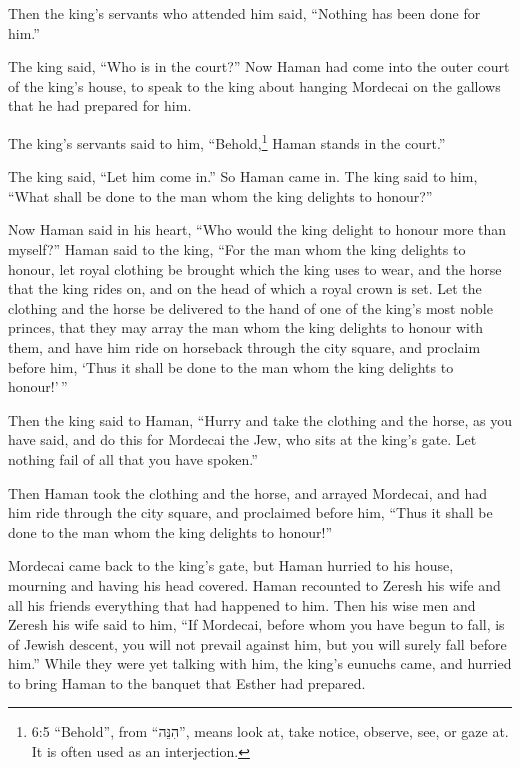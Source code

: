 Then the king's servants who attended him said, ``Nothing has been done
for him.''

 The king said, ``Who is in the court?'' Now Haman had come
into the outer court of the king's house, to speak to the king about
hanging Mordecai on the gallows that he had prepared for him.

 The king's servants said to him, ``Behold,\footnote{6:5
  ``Behold'', from ``הִנֵּה'', means look at, take notice, observe, see,
  or gaze at. It is often used as an interjection.} Haman stands in the
court.''

The king said, ``Let him come in.''  So Haman came in. The
king said to him, ``What shall be done to the man whom the king delights
to honour?''

Now Haman said in his heart, ``Who would the king delight to honour more
than myself?''  Haman said to the king, ``For the man whom
the king delights to honour,  let royal clothing be brought
which the king uses to wear, and the horse that the king rides on, and
on the head of which a royal crown is set.  Let the clothing
and the horse be delivered to the hand of one of the king's most noble
princes, that they may array the man whom the king delights to honour
with them, and have him ride on horseback through the city square, and
proclaim before him, `Thus it shall be done to the man whom the king
delights to honour!'\,''

 Then the king said to Haman, ``Hurry and take the clothing
and the horse, as you have said, and do this for Mordecai the Jew, who
sits at the king's gate. Let nothing fail of all that you have spoken.''

 Then Haman took the clothing and the horse, and arrayed
Mordecai, and had him ride through the city square, and proclaimed
before him, ``Thus it shall be done to the man whom the king delights to
honour!''

 Mordecai came back to the king's gate, but Haman hurried
to his house, mourning and having his head covered.  Haman
recounted to Zeresh his wife and all his friends everything that had
happened to him. Then his wise men and Zeresh his wife said to him, ``If
Mordecai, before whom you have begun to fall, is of Jewish descent, you
will not prevail against him, but you will surely fall before him.''
 While they were yet talking with him, the king's eunuchs
came, and hurried to bring Haman to the banquet that Esther had
prepared.

